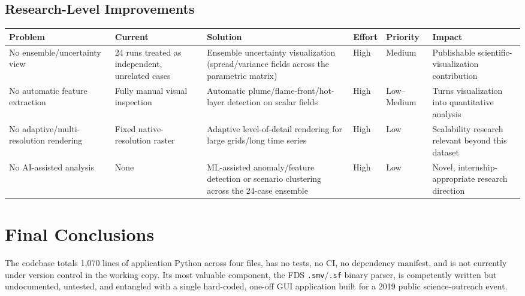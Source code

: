 \documentclass[11pt,a4paper]{report}
\begin{document}
\begin{landscape}
\section{Research-Level Improvements}
\begin{longtable}{p{2.6cm}p{3.4cm}p{3.4cm}p{1.4cm}p{1.2cm}p{2.6cm}}
\toprule
\textbf{Problem} & \textbf{Current} & \textbf{Solution} & \textbf{Effort} & \textbf{Priority} & \textbf{Impact} \\
\midrule
No ensemble/uncertainty view & 24 runs treated as independent, unrelated cases & Ensemble uncertainty visualization (spread/variance fields across the parametric matrix) & High & Medium & Publishable scientific-visualization contribution \\
No automatic feature extraction & Fully manual visual inspection & Automatic plume/flame-front/hot-layer detection on scalar fields & High & Low--Medium & Turns visualization into quantitative analysis \\
No adaptive/multi-resolution rendering & Fixed native-resolution raster & Adaptive level-of-detail rendering for large grids/long time series & High & Low & Scalability research relevant beyond this dataset \\
No AI-assisted analysis & None & ML-assisted anomaly/feature detection or scenario clustering across the 24-case ensemble & High & Low & Novel, internship-appropriate research direction \\
\bottomrule
\end{longtable}
\end{landscape}

\chapter{Final Conclusions}

\begin{factbox}
The codebase totals 1{,}070 lines of application Python across four files, has no tests, no CI, no
dependency manifest, and is not currently under version control in the working copy. Its most valuable
component, the FDS \texttt{.smv}/\texttt{.sf} binary parser, is competently written but undocumented,
untested, and entangled with a single hard-coded, one-off GUI application built for a 2019 public
science-outreach event.
\end{factbox}
\end{document}

